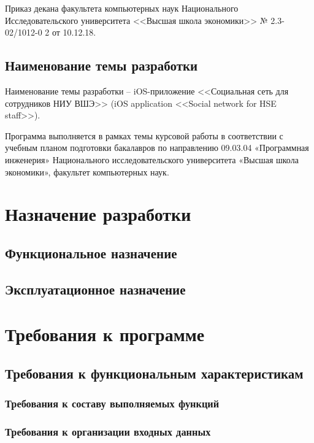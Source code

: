 \documentclass[a4paper,12pt,reqno]{article}
\begin{document}
	
	Приказ декана факультета компьютерных наук Национального Исследовательского университета <<Высшая школа экономики>> № 2.3-02/1012-0 2 от 10.12.18.
	
	\subsection{Наименование темы разработки}
	
	Наименование темы разработки – iOS-приложение <<Социальная сеть для сотрудников НИУ ВШЭ>>  (iOS application <<Social network for HSE staff>>).


 Программа выполняется в рамках темы курсовой работы в соответствии с учебным планом подготовки бакалавров по направлению 09.03.04 «Программная инженерия» Национального исследовательского университета «Высшая школа экономики», факультет компьютерных наук.
	
	\newpage 
	\section{Назначение разработки}
	 
	\subsection{Функциональное назначение}
	
	\subsection{Эксплуатационное назначение}
	
	
						\newpage
	\section{Требования к программе}
	\subsection{Требования к функциональным характеристикам}
	\subsubsection{Требования к составу выполняемых функций}\label{subsec:requirements}
	
	
	\subsubsection{Требования к организации входных данных}
	
\end{document}
